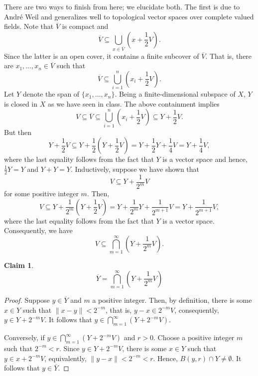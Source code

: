 \documentclass[10pt]{amsart}
\theoremstyle{thmstyle}
\newtheorem*{claim}{Claim}
\theoremstyle{defstyle}
\begin{document}
There are two ways to finish from here; we elucidate both. The first is due to Andr\'e Weil and generalizes well to topological vector spaces over complete valued fields. Note that $\overline V$ is compact and 
\begin{equation*}
	\overline V \subseteq \bigcup_{x\in\overline V}\left(x + \frac{1}{2}V\right).
\end{equation*}
Since the latter is an open cover, it contains a finite subcover of $\overline V$. That is, there are $x_1,\dots,x_n\in\overline V$ such that 
\begin{equation*}
	\overline V\subseteq\bigcup_{i = 1}^n \left(x_i + \frac{1}{2}V\right).
\end{equation*}
Let $Y$ denote the span of $\{x_1,\dots,x_n\}$. Being a finite-dimensional subspace of $X$, $Y$ is closed in $X$ as we have seen in class. The above containment implies 
\begin{equation*}
	V\subseteq\overline V\subseteq\bigcup_{i = 1}^n\left(x_i + \frac{1}{2}V\right)\subseteq Y + \frac{1}{2}V.
\end{equation*}
But then 
\begin{equation*}
	Y + \frac{1}{2}V\subseteq Y + \frac{1}{2}\left(Y + \frac{1}{2}V\right) = Y + \frac{1}{2}Y + \frac{1}{4}V = Y + \frac{1}{4}V,
\end{equation*}
where the last equality follows from the fact that $Y$ is a vector space and hence, $\frac{1}{2}Y = Y$ and $Y + Y = Y$. Inductively, suppose we have shown that 
\begin{equation*}
	V\subseteq Y + \frac{1}{2^m}V
\end{equation*}
for some positive integer $m$. Then, 
\begin{equation*}
	V \subseteq Y + \frac{1}{2^m}\left(Y + \frac{1}{2}V\right) = Y + \frac{1}{2^m}Y + \frac{1}{2^{m + 1}}V = Y + \frac{1}{2^{m + 1}}V,
\end{equation*}
where the last equality follows from the fact that $Y$ is a vector space. Consequently, we have 
\begin{equation*}
	V\subseteq\bigcap_{m = 1}^\infty\left(Y + \frac{1}{2^m}V\right).
\end{equation*}

\begin{claim}
	\begin{equation*}
		\overline Y = \bigcap_{m = 1}^\infty\left(Y + \frac{1}{2^m}V\right)
	\end{equation*}
\end{claim}
\begin{proof}
	Suppose $y\in\overline Y$ and $m$ a positive integer. Then, by definition, there is some $x\in Y$ such that $\|x - y\| < 2^{-m}$, that is, $y - x\in 2^{-m}V$, consequently, $y\in Y + 2^{-m}V$. It follows that $y\in\bigcap_{m = 1}^\infty (Y + 2^{-m}V)$.

	Conversely, if $y\in\bigcap_{m = 1}^\infty(Y + 2^{-m}V)$ and $r > 0$. Choose a positive integer $m$ such that $2^{-m} < r$. Since $y\in Y + 2^{-m}V$, there is some $x\in Y$ such that $y\in x + 2^{-m}V$, equivalently, $\|y - x\| < 2^{-m} < r$. Hence, $B(y, r)\cap Y\ne\emptyset$. It follows that $y\in\overline Y$.
\end{proof}
\end{document}
